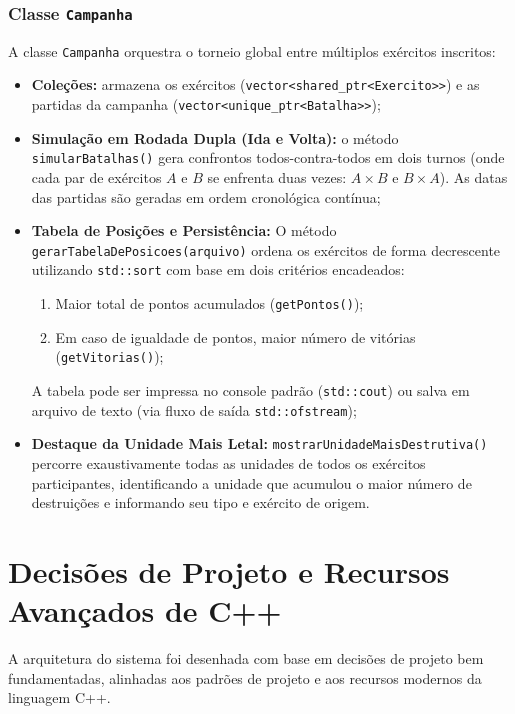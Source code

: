 \documentclass[12pt,a4paper]{article}
\begin{document}
\subsubsection{Classe \texttt{Campanha}}
A classe \texttt{Campanha} orquestra o torneio global entre múltiplos exércitos inscritos:
\begin{itemize}
    \item \textbf{Coleções:} armazena os exércitos (\texttt{vector<shared\_ptr<Exercito>>}) e as partidas da campanha (\texttt{vector<unique\_ptr<Batalha>>});
    \item \textbf{Simulação em Rodada Dupla (Ida e Volta):} o método \texttt{simularBatalhas()} gera confrontos todos-contra-todos em dois turnos (onde cada par de exércitos $A$ e $B$ se enfrenta duas vezes: $A \times B$ e $B \times A$). As datas das partidas são geradas em ordem cronológica contínua;
    \item \textbf{Tabela de Posições e Persistência:} O método \texttt{gerarTabelaDePosicoes}\allowbreak\texttt{(arquivo)} ordena os exércitos de forma decrescente utilizando \texttt{std::sort} com base em dois critérios encadeados:
    \begin{enumerate}
        \item Maior total de pontos acumulados (\texttt{getPontos()});
        \item Em caso de igualdade de pontos, maior número de vitórias (\texttt{getVitorias()});
    \end{enumerate}
    A tabela pode ser impressa no console padrão (\texttt{std::cout}) ou salva em arquivo de texto (via fluxo de saída \texttt{std::ofstream});
    \item \textbf{Destaque da Unidade Mais Letal:} \texttt{mostrarUnidadeMaisDestrutiva()} percorre exaustivamente todas as unidades de todos os exércitos participantes, identificando a unidade que acumulou o maior número de destruições e informando seu tipo e exército de origem.
\end{itemize}

\section{Decisões de Projeto e Recursos Avançados de C++}
\label{sec:decisoes}

A arquitetura do sistema foi desenhada com base em decisões de projeto bem fundamentadas, alinhadas aos padrões de projeto e aos recursos modernos da linguagem C++.
\end{document}
